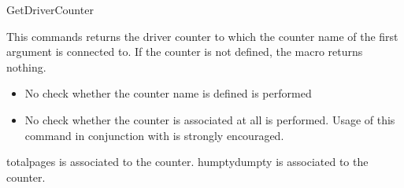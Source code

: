 \documentclass[12pt,a4paper,oneside]{article}
\begin{document}
\begin{docCommand}{GetDriverCounter}{}%

This commands returns the driver counter to which the counter name of the first argument is connected to. If the counter is not defined, the macro returns nothing. 

\begin{itemize}
  \item No check whether the counter name is defined is performed
  \item No check whether the counter is associated at all is performed. Usage of this command in conjunction with  is strongly encouraged. 
\end{itemize} 


\begin{dispExample}%
totalpages is associated to the \textcolor{blue}{\textbf{}} counter. 
humptydumpty is associated to the \textcolor{blue}{\textbf{}} counter. 

\end{dispExample}%

\end{docCommand}%
\end{document}
